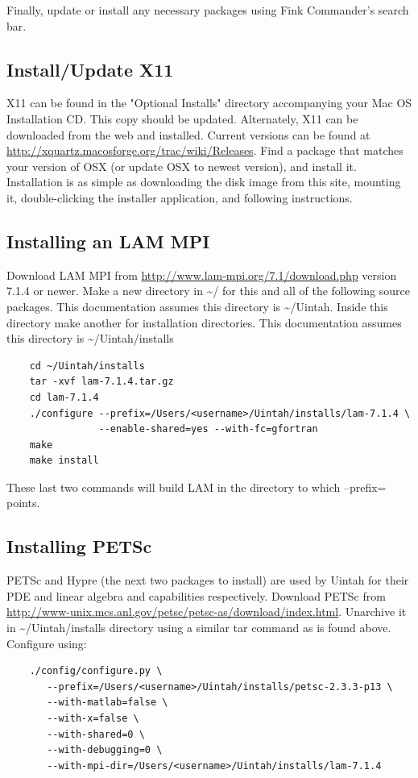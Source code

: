 \documentclass[12pt]{article}
\begin{document}
Finally, update or install any necessary packages using Fink
Commander's search bar.

\subsection{Install/Update X11}
X11 can be found in the "Optional Installs" directory accompanying
your Mac OS Installation CD.  This copy should be updated.
Alternately, X11 can be downloaded from the web and installed.
Current versions can be found at
\url{http://xquartz.macosforge.org/trac/wiki/Releases}.  Find a
package that matches your version of OSX (or update OSX to newest
version), and install it.  Installation is as simple as downloading
the disk image from this site, mounting it, double-clicking the
installer application, and following instructions.

\subsection{Installing an LAM MPI}
Download LAM MPI from \url{http://www.lam-mpi.org/7.1/download.php}
version 7.1.4 or newer.  Make a new directory in \textasciitilde/ for
this and all of the following source packages.  This documentation
assumes this directory is \textasciitilde/Uintah.  Inside this
directory make another for installation directories.  This
documentation assumes this directory is
\textasciitilde/Uintah/installs

\begin{verbatim}
	cd ~/Uintah/installs
	tar -xvf lam-7.1.4.tar.gz
	cd lam-7.1.4
	./configure --prefix=/Users/<username>/Uintah/installs/lam-7.1.4 \
	            --enable-shared=yes --with-fc=gfortran
	make
	make install
\end{verbatim}

These last two commands will build LAM in the directory to which
--prefix= points.

\subsection{Installing PETSc}
PETSc and Hypre (the next two packages to install) are used by Uintah
for their PDE and linear algebra and capabilities respectively.
Download PETSc from
\url{http://www-unix.mcs.anl.gov/petsc/petsc-as/download/index.html}.
Unarchive it in \textasciitilde/Uintah/installs directory using a
similar tar command as is found above.  Configure using:

\begin{verbatim}
	./config/configure.py \
	   --prefix=/Users/<username>/Uintah/installs/petsc-2.3.3-p13 \
	   --with-matlab=false \
	   --with-x=false \
	   --with-shared=0 \
	   --with-debugging=0 \
	   --with-mpi-dir=/Users/<username>/Uintah/installs/lam-7.1.4
\end{verbatim}
\end{document}
